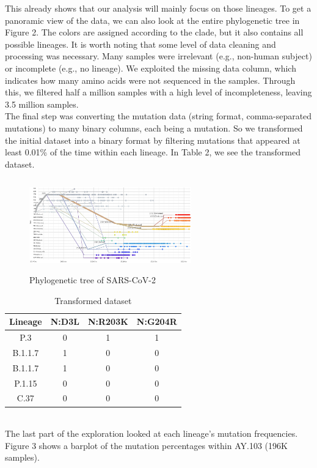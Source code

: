 \documentclass[twoside,twocolumn]{article}
\begin{document}
	This already shows that our analysis will mainly focus on those lineages. To get a panoramic view of the data, we can also look at the entire phylogenetic tree in Figure 2. The colors are assigned according to the clade, but it also contains all possible lineages. It is worth noting that some level of data cleaning and processing was necessary. Many samples were irrelevant (e.g., non-human subject) or incomplete (e.g., no lineage). We exploited the missing data column, which indicates how many amino acids were not sequenced in the samples. Through this, we filtered half a million samples with a high level of incompleteness, leaving 3.5 million samples. \\
	The final step was converting the mutation data (string format, comma-separated mutations) to many binary columns, each being a mutation. So we transformed the initial dataset into a binary format by filtering mutations that appeared at least 0.01\% of the time within each lineage. In Table 2, we see the transformed dataset.
	\begin{figure}[h]
		\caption{Phylogenetic tree of SARS-CoV-2}
		\label{tree}
		\centering
		\includegraphics[width=70mm, height=40mm]{covidtree.png}
	\end{figure}
	\begin{table}
		\caption{Transformed dataset}
		\centering
		\renewcommand{\arraystretch}{1.2} %
		\begin{tabular}{| c | c | c | c | }
			\hline
			Lineage & N:D3L & N:R203K & N:G204R\\
			\hline
			P.3& 0 & 1 & 1 \\
			B.1.1.7 & 1 & 0&0 \\
			B.1.1.7 & 1 & 0&0 \\
			P.1.15 & 0 & 0 &0\\
			C.37 & 0 & 0 &0\\
			\hline
		\end{tabular}
	\end{table}
	\\The last part of the exploration looked at each lineage's mutation frequencies. Figure 3 shows a barplot of the mutation percentages within AY.103 (196K samples).
\end{document}
